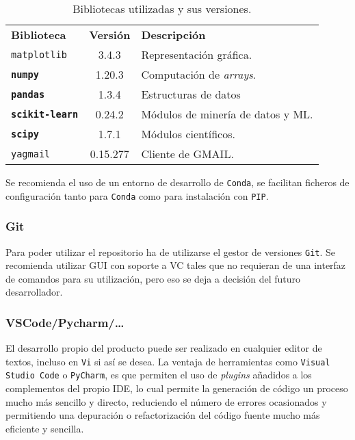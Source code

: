\begin{table}[]
\centering
\begin{tabular}{lcl}
	\textbf{Biblioteca} & \textbf{Versión} & \textbf{Descripción}\\ \rowcolor[HTML]{EFEFEF} 
	\toprule
	\rowcolor[HTML]{EFEFEF} 
	\texttt{matplotlib}    & 3.4.3   & Representación gráfica.   \\  
	\textbf{\texttt{numpy}}    & 1.20.3 &  Computación de \textit{arrays}.  \\ \rowcolor[HTML]{EFEFEF} 
	\textbf{\texttt{pandas}}    & 1.3.4  & Estructuras de datos    \\  
	\textbf{\texttt{scikit-learn}}    & 0.24.2 & Módulos de minería de datos y ML.   \\ \rowcolor[HTML]{EFEFEF} 
	\textbf{\texttt{scipy}}    & 1.7.1  & Módulos científicos.    \\ 
	\texttt{yagmail}    & 0.15.277  & Cliente de GMAIL.    \\ 
	\bottomrule
\end{tabular}
\caption{Bibliotecas utilizadas y sus versiones.}\label{tab:bibliotecas-python-is-ssl}
\end{table}

Se recomienda el uso de un entorno de desarrollo de \texttt{Conda}, se facilitan ficheros de configuración tanto para \texttt{Conda} como para instalación con \texttt{PIP}.

\subsubsection{Git}
Para poder utilizar el repositorio ha de utilizarse el gestor de versiones \texttt{Git}. Se recomienda utilizar GUI con soporte a VC tales que no requieran de una interfaz de comandos para su utilización, pero eso se deja a decisión del futuro desarrollador.

\subsubsection{VSCode/Pycharm/\dots}
El desarrollo propio del producto puede ser realizado en cualquier editor de textos, incluso en \texttt{Vi} si así se desea. La ventaja de herramientas como \texttt{Visual Studio Code} o \texttt{PyCharm}, es que permiten el uso de \textit{plugins} añadidos a los complementos del propio IDE, lo cual permite la generación de código un proceso mucho más sencillo y directo, reduciendo el número de errores ocasionados y permitiendo una depuración o refactorización del código fuente mucho más eficiente y sencilla.

